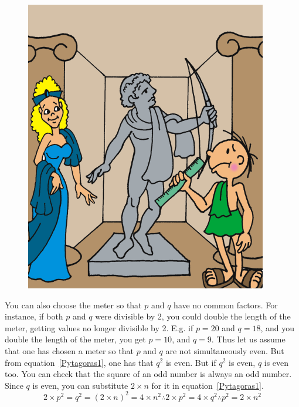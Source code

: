 \documentclass[a4paper,12pt]{book}
\begin{document}
\begin{figure}
	\includegraphics{fig-sets/apolob.png}
\end{figure}
You can also choose the meter so that $p$ and  $q$ have no common factors. For instance,
if both $p$ and $q$ were divisible by 2, you could double the length of the meter, getting
values no longer divisible by 2. E.g. if $p=20$ and $q=18$, and you double the length of
the meter, you get $p=10$, and $q=9$. Thus let us assume that one has chosen a meter so
that $p$ and $q$ are not simultaneously even. But from equation~\ref{Pytagoras1}, one
has that $q^2$ is even. But if $q^2$ is even, $q$ is even too. You can check that
the square of an odd number is always an odd number. Since $q$ is even, you can
substitute $2\times n$ for it in equation~\ref{Pytagoras1}.
\begin{equation}
	2\times p^2= q^2= (2\times n)^2= 4\times n^2 \therefore 2\times p^2= 4\times q^2
	\therefore p^2= 2\times n^2
	\label{peven}
\end{equation}
\end{document}
